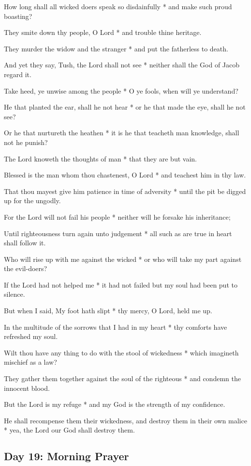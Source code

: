 How long shall all wicked doers speak so disdainfully * and make such proud boasting?

They smite down thy people, O Lord * and trouble thine heritage.

They murder the widow and the stranger * and put the fatherless to death.

And yet they say, Tush, the Lord shall not see * neither shall the God of Jacob regard it.

Take heed, ye unwise among the people * O ye fools, when will ye understand?

He that planted the ear, shall he not hear * or he that made the eye, shall he not see?

Or he that nurtureth the heathen * it is he that teacheth man knowledge, shall not he punish?

The Lord knoweth the thoughts of man * that they are but vain.

Blessed is the man whom thou chastenest, O Lord * and teachest him in thy law.

That thou mayest give him patience in time of adversity * until the pit be digged up for the ungodly.

For the Lord will not fail his people * neither will he forsake his inheritance;

Until righteousness turn again unto judgement * all such as are true in heart shall follow it.

Who will rise up with me against the wicked * or who will take my part against the evil-doers?

If the Lord had not helped me * it had not failed but my soul had been put to silence.

But when I said, My foot hath slipt * thy mercy, O Lord, held me up.

In the multitude of the sorrows that I had in my heart * thy comforts have refreshed my soul.

Wilt thou have any thing to do with the stool of wickedness * which imagineth mischief as a law?

They gather them together against the soul of the righteous * and condemn the innocent blood.

But the Lord is my refuge * and my God is the strength of my confidence.

He shall recompense them their wickedness, and destroy them in their own malice * yea, the Lord our God shall destroy them.

\subsection{Day 19: Morning Prayer}

